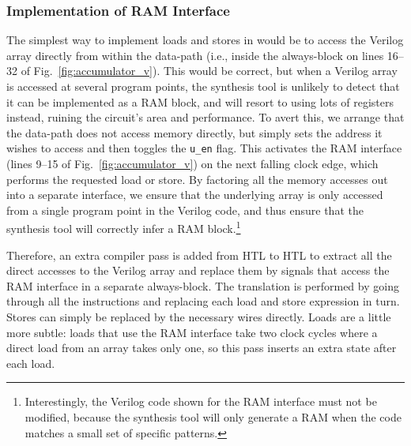 \subsubsection{Implementation of RAM Interface}\label{sec:algorithm:optimisation:ram}
The simplest way to implement loads and stores in \vericert{} would be to access the Verilog array directly from within the data-path (i.e., inside the always-block on lines 16--32 of Fig.~\ref{fig:accumulator_v}). This would be correct, but when a Verilog array is accessed at several program points, the synthesis tool is unlikely to detect that it can be implemented as a RAM block, and will resort to using lots of registers instead, ruining the circuit's area and performance.  To avert this, we arrange that the data-path does not access memory directly, but simply sets the address it wishes to access and then toggles the \texttt{u\_en} flag. This activates the RAM interface (lines 9--15 of Fig.~\ref{fig:accumulator_v}) on the next falling clock edge, which performs the requested load or store. By factoring all the memory accesses out into a separate interface, we ensure that the underlying array is only accessed from a single program point in the Verilog code, and thus ensure that the synthesis tool will correctly infer a RAM block.\footnote{Interestingly, the Verilog code shown for the RAM interface must not be modified, because the synthesis tool will only generate a RAM when the code matches a small set of specific patterns.}


Therefore, an extra compiler pass is added from HTL to HTL to extract all the direct accesses to the Verilog array and replace them by signals that access the RAM interface in a separate always-block. The translation is performed by going through all the instructions and replacing each load and store expression in turn.  Stores can simply be replaced by the necessary wires directly. Loads are a little more subtle: loads that use the RAM interface take two clock cycles where a direct load from an array takes only one, so this pass inserts an extra state after each load.

